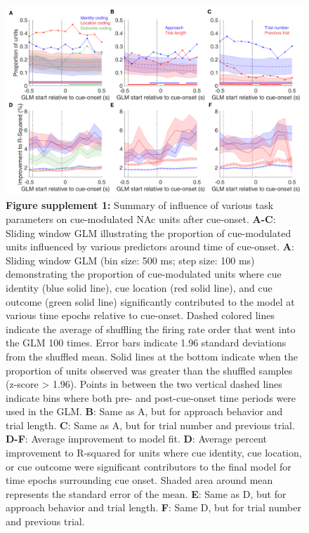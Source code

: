\documentclass[11pt]{article}
\newcommand{\bsf}[1]{\textbf{#1}}
\begin{document}
 \begin{figure}[ht!]
\centering
\includegraphics[width=\textwidth]{Fig 5 - SUPP GLM.pdf}
\caption*{\bsf{Figure supplement 1:} Summary of influence of various task parameters on
cue-modulated NAc units after cue-onset. \bsf{A-C}: Sliding window GLM illustrating the proportion of cue-modulated units influenced by various predictors around time
of cue-onset. \bsf{A}: Sliding window GLM (bin size: 500 ms; step
size: 100 ms) demonstrating the proportion of cue-modulated units
where cue identity (blue solid line), cue location (red solid line),
and cue outcome (green solid line) significantly contributed to the
model at various time epochs relative to cue-onset. Dashed colored
lines indicate the average of shuffling the firing rate order that
went into the GLM 100 times. Error bars indicate 1.96 standard deviations from the shuffled mean. Solid lines at the bottom indicate when the proportion of units observed was greater than the shuffled samples (z-score > 1.96). Points in between the two vertical dashed lines indicate
bins where both pre- and post-cue-onset time periods were used in
the GLM. \bsf{B}: Same as A, but for approach behavior and trial
length. \bsf{C}: Same as A, but for trial number and previous
trial. \bsf{D-F}: Average improvement to model fit. \bsf{D}: Average
percent improvement to R-squared for units where cue identity, cue
location, or cue outcome were significant contributors to the final
model for time epochs surrounding cue onset. Shaded area around mean
represents the standard error of the mean. \bsf{E}: Same as D, but
for approach behavior and trial length. \bsf{F}: Same D, but for
trial number and previous trial.}
\label{fig:Q1SUPP1}
\end{figure} \clearpage
\end{document}
